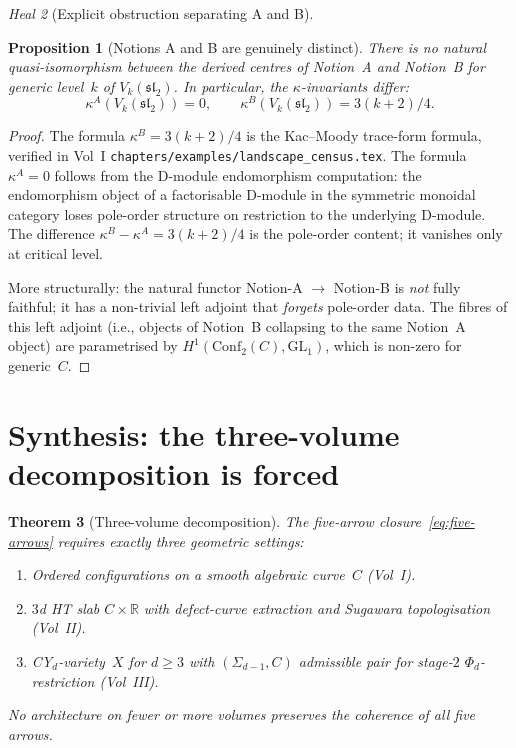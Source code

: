\documentclass[11pt]{article}
\newtheorem{thm}{Theorem}[section]
\newtheorem{prop}[thm]{Proposition}
\theoremstyle{definition}
\theoremstyle{remark}
\newtheorem{heal}[thm]{Heal}
\newcommand{\bR}{\mathbb{R}}
\newcommand{\fsl}{\mathfrak{sl}}
\newcommand{\Conf}{\mathrm{Conf}}
\begin{document}
\begin{heal}[Explicit obstruction separating A and B]
\begin{prop}[Notions A and B are genuinely distinct]
\label{prop:A-B-distinct}
There is no natural quasi-isomorphism between the derived centres
of Notion~A and Notion~B for generic level~$k$ of
$V_k(\fsl_2)$. In particular, the $\kappa$-invariants differ:
\[
\kappa^A(V_k(\fsl_2)) = 0,
\qquad
\kappa^B(V_k(\fsl_2)) = 3(k+2)/4.
\]
\end{prop}

\begin{proof}
The formula $\kappa^B = 3(k+2)/4$ is the Kac--Moody trace-form
formula, verified in Vol~I
\texttt{chapters/examples/landscape\_census.tex}. The formula
$\kappa^A = 0$ follows from the D-module endomorphism computation:
the endomorphism object of a factorisable D-module in the symmetric
monoidal category loses pole-order structure on restriction to the
underlying D-module. The difference $\kappa^B - \kappa^A = 3(k+2)/4$
is the pole-order content; it vanishes only at critical level.

More structurally: the natural functor Notion-A $\to$ Notion-B is
\emph{not} fully faithful; it has a non-trivial left adjoint that
\emph{forgets} pole-order data. The fibres of this left adjoint
(i.e., objects of Notion~B collapsing to the same Notion~A object)
are parametrised by $H^1(\Conf_2(C), \mathrm{GL}_1)$, which is
non-zero for generic~$C$.
\end{proof}
\end{heal}

\section{Synthesis: the three-volume decomposition is forced}

\begin{thm}[Three-volume decomposition]
\label{thm:three-volume}
The five-arrow closure~\eqref{eq:five-arrows} requires exactly three
geometric settings:
\begin{enumerate}[leftmargin=*,itemsep=0pt]
\item Ordered configurations on a smooth algebraic curve~$C$ (Vol~I).
\item $3$d HT slab $C \times \bR$ with defect-curve extraction and
Sugawara topologisation (Vol~II).
\item CY$_d$-variety~$X$ for $d \geq 3$ with $(\Sigma_{d-1}, C)$
admissible pair for stage-$2$ $\Phi_d$-restriction (Vol~III).
\end{enumerate}
No architecture on fewer or more volumes preserves the coherence of
all five arrows.
\end{thm}
\end{document}
